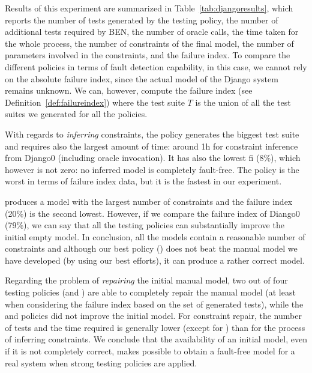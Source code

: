 \begin{tikzborder}{\cite{Gargantini16:validation}}
\begin{tikzborder}{\cite{gargantini_combinatorial_2017}}
\begin{tikzborder}{\cite{gargantini_combinatorial_2017}}
\bb Results of this experiment are summarized in Table~\ref{tab:djangoresults}, which reports the number of tests generated by the testing policy, the number of additional tests required by BEN, the number of oracle calls, the time taken for the whole process, the number of constraints of the final model, the number of parameters involved in the constraints, and the failure index. 
To compare the different policies in terms of fault detection capability, in this case, we cannot rely on the absolute failure index, since the actual model of the Django system remains unknown. We can, however, compute the failure index (see Definition~\ref{def:failureindex}) %
where the test suite $T$ is the union of all the test suites we generated for all the policies. 


With regards to \emph{inferring} constraints,  the \cucv policy generates the biggest test suite and requires also the largest amount of time: around 1h for constraint inference from {\sf Django0} (including oracle invocation). It has also the lowest {\sf fi} (8\%), which however is not zero: no inferred model is completely fault-free. The \ic policy is the worst in terms of failure index data, but it is the fastest in our experiment.

\noindent \ValC produces a model with the largest number of constraints and the failure index (20\%) is the second lowest. %
However, if we compare the failure index of Diango0 (79\%), we can say that all the testing policies can substantially improve the initial empty model. In conclusion, all the models contain a reasonable number of constraints and although our best policy (\cucv) does not beat the manual model we have developed (by using our best efforts), it can produce a rather correct model.  

Regarding the problem of \emph{repairing}  the initial manual model, two out of four testing policies (\cucv and \ValC) are able to completely repair the manual model (at least when considering the failure index based on the set of generated tests), while the \ic and \ccit policies did not improve the initial model.  For constraint repair, the number of tests and the time required is generally lower (except for \ic) than for the process of inferring constraints. We conclude that the availability of an initial model, even if it is not completely correct, makes possible to obtain a fault-free model for a real system when strong testing policies are applied.


\end{tikzborder}
\end{tikzborder}
\end{tikzborder}
